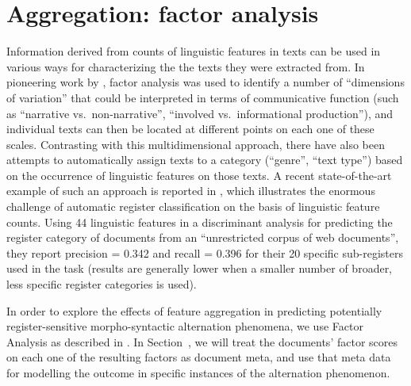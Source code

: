\section{Aggregation: factor analysis}

Information derived from counts of linguistic features in texts can be used in various ways for characterizing the the texts they were extracted from. In pioneering work by \cite{Biber1988,Biber1995}, factor analysis was used to identify a number of ``dimensions of variation'' that could be interpreted in terms of communicative function (such as ``narrative vs.\ non-narrative'', ``involved vs.\ informational production''), and individual texts can then be located at different points on each one of these scales. Contrasting with this multidimensional approach, there have also been attempts to automatically assign texts to a category (``genre'', ``text type'') based on the occurrence of linguistic features on those texts. A recent state-of-the-art example of such an approach is reported in \cite{EgbertBiberDavis2015}, which illustrates the enormous challenge of automatic register classification on the basis of linguistic feature counts. Using 44 linguistic features in a discriminant analysis for predicting the register category of documents from an ``unrestricted corpus of web documents'', they report precision = 0.342 and recall = 0.396 for their 20 specific sub-registers used in the task (results are generally lower when a smaller number of broader, less specific register categories is used).

In order to explore the effects of feature aggregation in predicting potentially register-sensitive morpho-syntactic alternation phenomena, we use Factor Analysis as described in \cite{Biber1988,Biber1995}. In Section~, we will treat the documents' factor scores on each one of the resulting factors as document meta, and use that meta data for modelling the outcome in specific instances of the alternation phenomenon.


